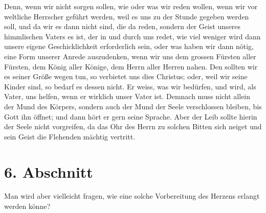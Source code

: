 Denn, wenn wir nicht sorgen sollen, wie oder was wir reden
wollen, wenn wir vor
weltliche Herrscher
geführt werden, weil es uns zu der Stunde gegeben werden soll, und da wir es
dann nicht sind, die da reden, sondern der Geist unseres himmlischen Vaters es
ist, der in und durch uns redet, wie viel weniger wird dann unsere eigene
Geschicklichkeit erforderlich sein, oder was haben wir dann nötig, eine Form
unserer Anrede
auszudenken, wenn wir uns dem grossen Fürsten aller Fürsten, dem König aller
Könige, dem Herrn aller Herren nahen. Den sollten wir es seiner Größe wegen
tun, so verbietet uns dies Christus; oder, weil wir seine Kinder sind, so
bedarf es dessen nicht. Er weiss, was wir bedürfen, und wird, als Vater, uns
helfen, wenn er wirklich unser Vater ist. Demnach muss nicht allein der Mund des
Körpers, sondern auch der Mund
der Seele verschlossen bleiben, bis Gott ihn öffnet; und dann hört er gern seine
Sprache. Aber der Leib sollte hierin der Seele nicht vorgreifen, da das Ohr des
Herrn zu solchen Bitten sich neiget und sein Geist die Flehenden mächtig
vertritt.

\section{6. Abschnitt} \label{kap6_ab6}

Man wird aber vielleicht fragen, wie eine solche Vorbereitung des
Herzens erlangt werden könne?

\medskip

